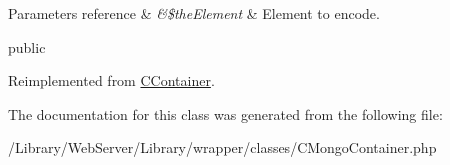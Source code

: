 \begin{DoxyParams}[1]{Parameters}
reference & {\em \&\$the\-Element} & Element to encode.\\
\hline
\end{DoxyParams}
public 

Reimplemented from \hyperlink{class_c_container_a09d585e2a9809221a42d52d7520c9cbf}{C\-Container}.



The documentation for this class was generated from the following file\-:\begin{DoxyCompactItemize}
\item 
/\-Library/\-Web\-Server/\-Library/wrapper/classes/C\-Mongo\-Container.\-php\end{DoxyCompactItemize}

